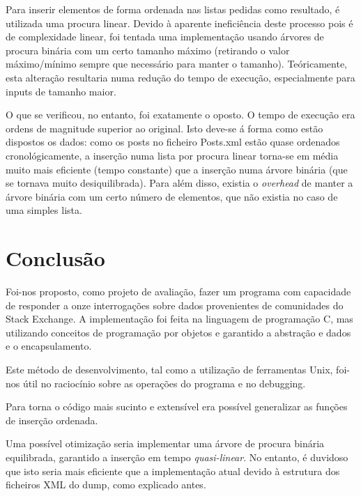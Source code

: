 \documentclass[10pt]{report}
\newcommand\tab[1][0.5cm]{\hspace*{#1}}
\begin{document}
\tab Para inserir elementos de forma ordenada nas listas pedidas como resultado, é utilizada uma procura linear. Devido à aparente ineficiência deste processo pois é de complexidade linear, foi tentada uma implementação usando árvores de procura binária com um certo tamanho máximo (retirando o valor máximo/mínimo sempre que necessário para manter o tamanho). Teóricamente, esta alteração resultaria numa redução do tempo de execução, especialmente para inputs de tamanho maior.

O que se verificou, no entanto, foi exatamente o oposto. O tempo de execução era ordens de magnitude superior ao original. Isto deve-se á forma como estão dispostos os dados: como os posts no ficheiro Posts.xml estão quase ordenados cronológicamente, a inserção numa lista por procura linear torna-se em média muito mais eficiente (tempo constante) que a inserção numa árvore binária (que se tornava muito desiquilibrada). Para além disso, existia o \textit{overhead} de manter a árvore binária com um certo número de elementos, que não existia no caso de uma simples lista.

\chapter{Conclusão}

\tab Foi-nos proposto, como projeto de avaliação, fazer um programa com capacidade de responder a onze interrogações sobre dados provenientes de comunidades do Stack Exchange. A implementação foi feita na linguagem de programação C, mas utilizando conceitos de programação por objetos e garantido a abstração e dados e o encapsulamento.

Este método de desenvolvimento, tal como a utilização de ferramentas Unix, foi-nos útil no raciocínio sobre as operações do programa e no debugging.

Para torna o código mais sucinto e extensível era possível generalizar as funções de inserção ordenada.

Uma possível otimização seria implementar uma árvore de procura binária equilibrada, garantido a inserção em tempo \textit{quasi-linear}. No entanto, é duvidoso que isto seria mais eficiente que a implementação atual devido à estrutura dos ficheiros XML do dump, como explicado antes.

\label{sec:conclusao}
\end{document}
